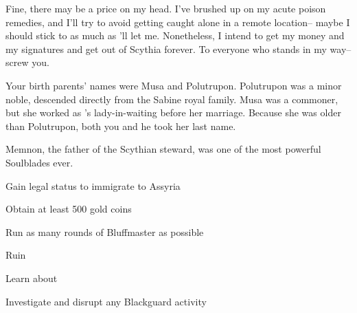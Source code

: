 \documentclass[char]{Kos}
\begin{document}
Fine, there may be a price on my head. I've brushed up on my acute poison remedies, and I'll try to avoid getting caught alone in a remote location-- maybe I should stick to \cPoet{} as much as \cPoet{\they}'ll let me. Nonetheless, I intend to get my money and my signatures and get out of Scythia forever. To everyone who stands in my way-- screw you.

\begin{itemz}[Notes]
  \item Your birth parents' names were Musa and Polutrupon. Polutrupon was a minor noble, descended directly from the Sabine royal family. Musa was a commoner, but she worked as \cScythiaQueen{}'s lady-in-waiting before her marriage. Because she was older than Polutrupon, both you and he took her last name.
  \item Memnon, the father of the Scythian steward, was one of the most powerful Soulblades ever.
\end{itemz}

\begin{itemz}[Goals]
\item Gain legal status to immigrate to Assyria
\item Obtain at least 500 gold coins
\item Run as many rounds of Bluffmaster as possible
\item Ruin \cBride{}
\item Learn about \cAnarchist{}
\item Investigate and disrupt any Blackguard activity
\end{itemz}
\end{document}
